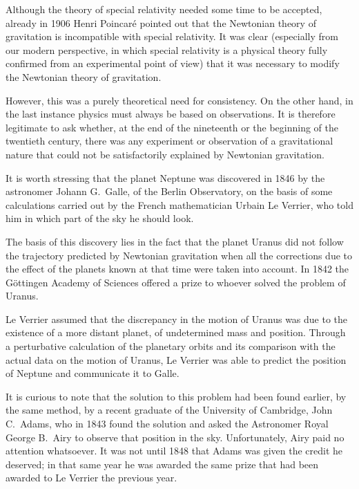 \begin{points}
\item Although the theory of special relativity needed some time to be accepted, already in 1906 Henri Poincaré pointed out that the Newtonian theory of gravitation is incompatible with special relativity. It was clear (especially from our modern perspective, in which special relativity is a physical theory fully confirmed from an experimental point of view) that it was necessary to modify the Newtonian theory of gravitation.

\item However, this was a purely theoretical need for consistency. On the other hand, in the last instance physics must always be based on observations. It is therefore legitimate to ask whether, at the end of the nineteenth or the beginning of the twentieth century, there was any experiment or observation of a gravitational nature that could not be satisfactorily explained by Newtonian gravitation.

\item It is worth stressing that the planet Neptune was discovered in 1846 by the astronomer Johann G.~Galle, of the Berlin Observatory, on the basis of some calculations carried out by the French mathematician Urbain Le Verrier, who told him in which part of the sky he should look.

\item The basis of this discovery lies in the fact that the planet Uranus did not follow the trajectory predicted by Newtonian gravitation when all the corrections due to the effect of the planets known at that time were taken into account. In 1842 the Göttingen Academy of Sciences offered a prize to whoever solved the problem of Uranus.

\item Le Verrier assumed that the discrepancy in the motion of Uranus was due to the existence of a more distant planet, of undetermined mass and position. Through a perturbative calculation of the planetary orbits and its comparison with the actual data on the motion of Uranus, Le Verrier was able to predict the position of Neptune and communicate it to Galle.

\item It is curious to note that the solution to this problem had been found earlier, by the same method, by a recent graduate of the University of Cambridge, John C.~Adams, who in 1843 found the solution and asked the Astronomer Royal George B.~Airy to observe that position in the sky. Unfortunately, Airy paid no attention whatsoever. It was not until 1848 that Adams was given the credit he deserved; in that same year he was awarded the same prize that had been awarded to Le Verrier the previous year.


\end{points}
